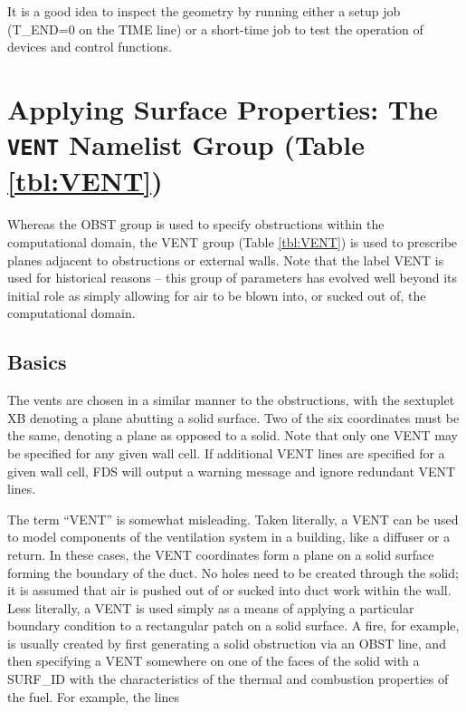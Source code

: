 \documentclass[11pt]{book}
\begin{document}
It is a good idea to inspect the geometry by running either a setup job
({\ct T\_END=0} on the {\ct TIME} line) or a short-time job to test the operation of devices and control functions.



\section{Applying Surface Properties: The \texorpdfstring{{\tt VENT}}{VENT} Namelist Group (Table \ref{tbl:VENT})}
\label{info:VENT}

Whereas the {\ct OBST} group is used to specify obstructions within the
computational domain, the {\ct VENT} group (Table \ref{tbl:VENT}) is used to prescribe planes
adjacent to obstructions or external walls. Note that the label {\ct VENT} is used for historical reasons -- this group of parameters has
evolved well beyond its initial role as simply allowing for air to be blown into, or sucked out of, the computational domain.

\subsection{Basics}

\label{info:VENT_Basics}

The vents are chosen in a similar manner to the obstructions, with the sextuplet {\ct XB} denoting a plane abutting a solid surface. Two of the six coordinates must be the same, denoting a plane as opposed to a solid. Note that only one {\ct VENT} may be specified for any given wall cell.  If additional {\ct VENT} lines are specified for a given wall cell, FDS will output a warning message and ignore redundant {\ct VENT} lines.

The term ``{\ct VENT}'' is somewhat misleading. Taken literally, a
{\ct VENT} can be used to model components of the ventilation system in
a building, like a diffuser or a return.
In these cases, the {\ct VENT} coordinates form a plane on a
solid surface forming the boundary of the duct.
No holes need to be created through the solid; it is
assumed that air is pushed out of or sucked into duct work within the
wall. Less literally, a {\ct VENT} is used simply as a means of applying
a particular boundary condition to a rectangular patch on a solid surface.
A fire, for example, is usually created by first generating a solid
obstruction via an {\ct OBST} line, and then specifying a {\ct VENT}
somewhere on one of the faces of the solid with a {\ct SURF\_ID}
with the characteristics of the thermal and combustion properties of the fuel.
For example, the lines
\end{document}
